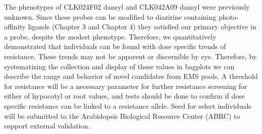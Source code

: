 The phenotypes of CLK024F02 dansyl and CLK042A09 dansyl were previously unknown. Since these probes can be modified to diazirine containing photo-affinity ligands (Chapter 3 and Chapter 4) they satisfied our primary objective in a probe, despite the modest phenotype. Therefore, we quantitatively demonstrated that individuals can be found with dose specific trends of resistance. These trends may not be apparent or discernible by eye. Therefore, by systematizing the collection and display of these values in bagplots we can describe the range and behavior of novel candidates from EMS pools. A threshold for resistance will be a necessary parameter for further resistance screening for either of hypocotyl or root values, and tests should be done to confirm if dose specific resistance can be linked to a resistance allele. Seed for select individuals will be submitted to the Arabidopsis Biological Resource Center (ABRC)\cite{lamesch2012arabidopsis} to support external validation.  

